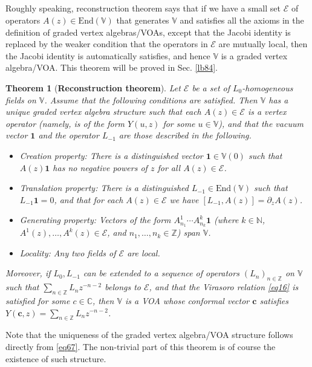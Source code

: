 \documentclass[11pt,b5paper,notitlepage]{article}
\theoremstyle{definition}
\theoremstyle{plain}
\newtheorem{thm}[df]{Theorem}
\newcommand{\mc}{\mathcal}
\newcommand{\End}{\mathrm{End}} %
\newcommand{\id}{\mathbf{1}}
\newcommand{\Vbb}{\mathbb V}
\newcommand{\Cbb}{\mathbb C}
\newcommand{\Nbb}{\mathbb N}
\newcommand{\Zbb}{\mathbb Z}
\newcommand{\cbf}{\mathbf c}
\numberwithin{equation}{section}
\begin{document}
\subsection{}




Roughly speaking, reconstruction theorem says that if we have a small set $\mc E$ of operators $A(z)\in\End(\Vbb)$ that generates $\Vbb$ and satisfies all the axioms in the definition of graded vertex algebras/VOAs, except that the Jacobi identity is replaced by the weaker condition that the operators in $\mc E$ are mutually local, then the Jacobi identity is automatically satisfies, and hence $\Vbb$ is a graded vertex algebra/VOA. This theorem will be proved in Sec. \ref{lb84}.


\begin{thm}[\textbf{Reconstruction theorem}]\label{lb39}
Let $\mc E$ be a set of $L_0$-homogeneous fields on $\Vbb$.  Assume that the following conditions are satisfied. Then $\Vbb$ has a unique graded vertex algebra structure such that each $A(z)\in\mc E$ is a vertex operator (namely, is of the form $Y(u,z)$ for some $u\in\Vbb$), and that the vacuum vector $\id$ and the operator $L_{-1}$  are those described in the following.
\begin{itemize}
\item Creation property: There is a distinguished vector $\id\in\Vbb(0)$ such that $A(z)\id$ has no negative powers of $z$ for all $A(z)\in\mc E$.
\item Translation property: There is a distinguished $L_{-1}\in\End(\Vbb)$ such that $L_{-1}\id=0$, and that for each $A(z)\in\mc E$ we have $[L_{-1},A(z)]=\partial_zA(z)$.
\item Generating property: Vectors of the form $A^1_{n_1}\cdots A^k_{n_k}\id$ (where $k\in\Nbb$, $A^1(z),\dots,A^k(z)\in\mc E$, and $n_1,\dots,n_k\in\Zbb$) span $\Vbb$. 
\item Locality: Any two fields of $\mc E$ are local.
\end{itemize}
Moreover, if $L_0,L_{-1}$ can be extended to a sequence of operators $(L_n)_{n\in\Zbb}$ on $\Vbb$ such that $\sum_{n\in\Zbb}L_nz^{-n-2}$ belongs to $\mc E$, and that the Virasoro relation \eqref{eq16} is satisfied for some $c\in\Cbb$, then $\Vbb$ is a VOA whose conformal vector $\cbf$ satisfies $Y(\cbf,z)=\sum_{n\in\Zbb}L_nz^{-n-2}$.
\end{thm}
Note that the uniqueness of the graded vertex algebra/VOA structure follows directly from \eqref{eq67}. The non-trivial part of this theorem is of course the existence of such structure.
\end{document}
